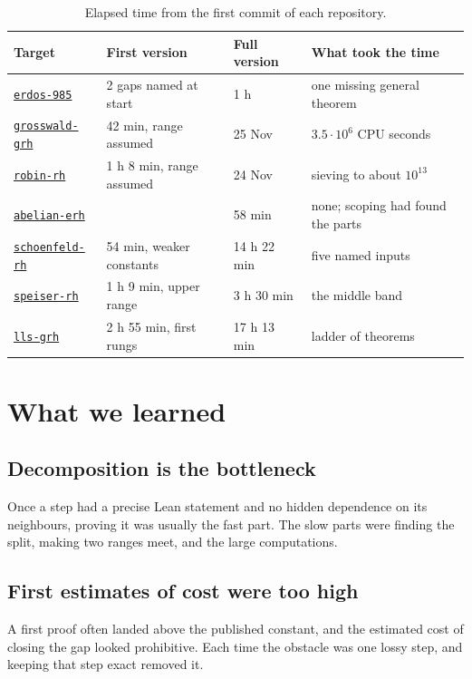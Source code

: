 \documentclass[11pt]{amsart}
\newcommand{\repo}[1]{\href{https://github.com/senamakel/#1}{\texttt{#1}}}
\begin{document}
\begin{table}[ht]
\small
\begin{tabular}{@{}llll@{}}
\toprule
Target & First version & Full version & What took the time\\
\midrule
\repo{erdos-985} \cite{r-erdos-985} & 2 gaps named at start & 1 h & one missing general theorem\\
\repo{grosswald-grh} \cite{r-grosswald-grh} & 42 min, range assumed & 25 Nov & $3.5\cdot10^6$ CPU seconds\\
\repo{robin-rh} \cite{r-robin-rh} & 1 h 8 min, range assumed & 24 Nov & sieving to about $10^{13}$\\
\repo{abelian-erh} \cite{r-abelian-erh} & & 58 min & none; scoping had found the parts\\
\repo{schoenfeld-rh} \cite{r-schoenfeld-rh} & 54 min, weaker constants & 14 h 22 min & five named inputs\\
\repo{speiser-rh} \cite{r-speiser-rh} & 1 h 9 min, upper range & 3 h 30 min & the middle band\\
\repo{lls-grh} \cite{r-lls-grh} & 2 h 55 min, first rungs & 17 h 13 min & ladder of theorems\\
\bottomrule
\end{tabular}
\medskip
\caption{Elapsed time from the first commit of each repository.}\label{tab:cases}
\end{table}

\section{What we learned}

\subsection*{Decomposition is the bottleneck} Once a step had a precise Lean statement and no hidden dependence on its neighbours, proving it was usually the fast part. The slow parts were finding the split, making two ranges meet, and the large computations.

\subsection*{First estimates of cost were too high} A first proof often landed above the published constant, and the estimated cost of closing the gap looked prohibitive. Each time the obstacle was one lossy step, and keeping that step exact removed it.
\end{document}

